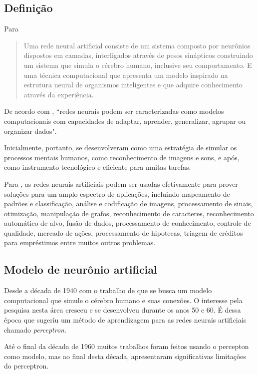 \subsection{Definição}

Para \cite[p. 41]{santos_um_2013} \begin{quote}
	Uma rede neural artificial consiste de um sistema composto por neurônios dispostos em camadas, interligados através de pesos sinápticos construindo um sistema que simula o cérebro humano, inclusive seu comportamento. E uma técnica computacional que apresenta um modelo inspirado na estrutura neural de organismos inteligentes e que adquire conhecimento através da experiência.
\end{quote}

De acordo com \cite[p. 47]{lima_ia_2016}, ``redes neurais podem ser caracterizadas como modelos computacionais com capacidades de adaptar, aprender, generalizar, agrupar ou organizar dados".

Inicialmente, portanto, se desenvolveram como uma estratégia de simular os processos mentais humanos, como reconhecimento de imagens e sons, e após, como instrumento tecnológico e eficiente para muitas tarefas. \cite{jin_development_2002}	

Para \cite{obaidat_multilayer_1994}, as redes neurais artificiais podem ser usadas efetivamente para prover soluções para um amplo espectro de aplicações, incluindo mapeamento de padrões e classificação, análise e codificação de imagens, processamento de sinais, otimização, manipulação de grafos, reconhecimento de caracteres, reconhecimento automático de alvo,  	fusão de dados, processamento de conhecimento, controle de qualidade, mercado de ações, processamento de hipotecas, triagem de créditos para empréstimos entre muitos outros problemas. 

\subsection{Modelo de neurônio artificial}\label{perceptron}
Desde a década de 1940 com o trabalho de \cite{mcculloch_logical_1943} que se busca um modelo computacional que simule o cérebro humano e suas conexões. O interesse pela pesquisa nesta área cresceu e se desenvolveu durante os anos 50 e 60. É dessa época que \cite{rosenblatt_perceptron:_1958} sugeriu um método de aprendizagem para as redes neurais artificiais chamado \textit{perceptron}. 

Até o final da década de 1960 muitos trabalhos foram feitos usando o percepton como modelo, mas ao final desta década, \cite{minsky_perceptrons:_1969} apresentaram significativas limitações do perceptron. 

